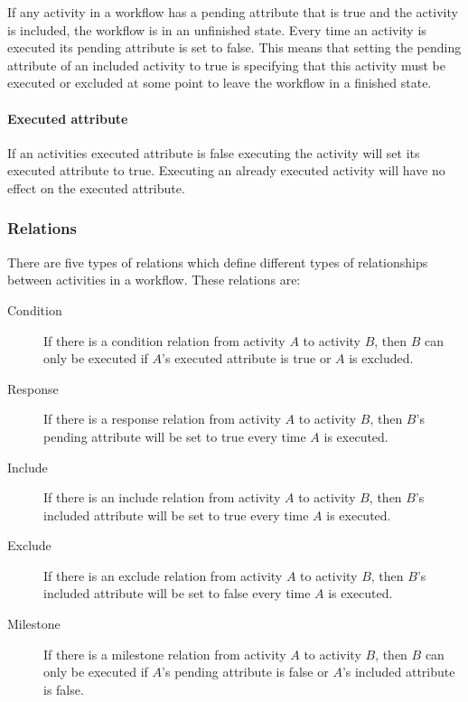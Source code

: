 \documentclass[12pt]{article}
\begin{document}
			If any activity in a workflow has a pending attribute that is true and the activity is included, the workflow is in an unfinished state.
			Every time an activity is executed its pending attribute is set to false.
			This means that setting the pending attribute of an included activity to true is specifying that this activity must be executed or excluded at some point to leave the workflow in a finished state.

			\paragraph{Executed attribute}

			If an activities executed attribute is false executing the activity will set its executed attribute to true.
			Executing an already executed activity will have no effect on the executed attribute.

		\subsubsection{Relations}

		There are five types of relations which define different types of relationships between activities in a workflow. 
		These relations are:

		\begin{description}
			\item[Condition] If there is a condition relation from activity $A$ to activity $B$, then $B$ can only be executed if $A$'s executed attribute is true or $A$ is excluded.
			\item[Response] If there is a response relation from activity $A$ to activity $B$, then $B$'s pending attribute will be set to true every time $A$ is executed.
			\item[Include] If there is an include relation from activity $A$ to activity $B$, then $B$'s included attribute will be set to true every time $A$ is executed.
			\item[Exclude] If there is an exclude relation from activity $A$ to activity $B$, then $B$'s included attribute will be set to false every time $A$ is executed.
			\item[Milestone] If there is a milestone relation from activity $A$ to activity $B$, then $B$ can only be executed if $A$'s pending attribute is false or $A$'s included attribute is false.
		\end{description}
\end{document}
